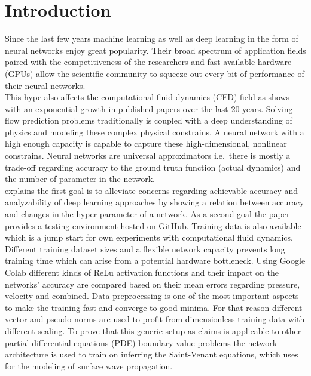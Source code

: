 \documentclass[acmtog]{techreportacmart}
\begin{document}
\section{Introduction}
Since the last few years machine learning as well as deep learning in the form 
of neural networks enjoy great popularity. Their broad spectrum of application 
fields paired with the competitiveness of the researchers and fast available hardware (GPUs) 
allow the scientific community to squeeze out every bit of performance of their 
neural networks. \\
This hype also affects the computational fluid dynamics (CFD) field as \cite{viquerat2019}
shows with an exponential growth in published papers over the last 20 years.
Solving flow prediction problems traditionally is coupled with a deep understanding 
of physics and modeling these complex physical constrains. A neural network with a 
high enough capacity is capable to capture these high-dimensional, nonlinear constrains.
Neural networks are universal approximators \cite{Approximation} i.e.\ there is mostly a
trade-off regarding accuracy to the ground truth function (actual dynamics) and the 
number of parameter in the network. \\
\cite{Thuerey20} explains the first goal is to alleviate concerns regarding achievable accuracy
and analyzability of deep learning approaches by showing a relation between accuracy and
changes in the  hyper-parameter of a network.
As a second goal the paper provides a testing environment hosted on GitHub. 
Training data is also available which is a jump start for own experiments with computational fluid dynamics. Different training
dataset sizes and a flexible network capacity prevents long training time which can arise
from a potential hardware bottleneck. Using Google Colab different kinds of ReLu activation 
functions and their impact on the networks' accuracy are compared based on their mean errors 
regarding pressure, velocity and combined. Data preprocessing is one of the most important 
aspects to make the training fast and converge to good minima. For that reason different vector 
and pseudo norms are used to profit from dimensionless training data with different scaling. To prove 
that this generic setup as \cite{Thuerey20} claims is applicable to other partial differential equations 
(PDE) boundary value problems the network architecture is used to train on inferring the Saint-Venant 
equations, which \cite{Fotiadis2020} uses for the modeling of surface wave propagation.
\end{document}
